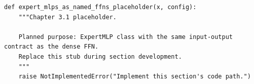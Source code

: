 \begin{lstlisting}[style=bookpython,caption={Planned code placeholder for expert MLPs as named FFNs.},label={lst:ch03-expert-mlps-as-named-ffns}]
def expert_mlps_as_named_ffns_placeholder(x, config):
    """Chapter 3.1 placeholder.

    Planned purpose: ExpertMLP class with the same input-output contract as the dense FFN.
    Replace this stub during section development.
    """
    raise NotImplementedError("Implement this section's code path.")
\end{lstlisting}
